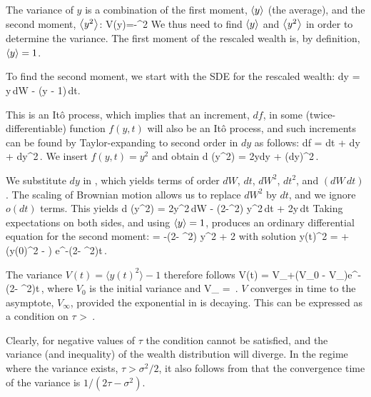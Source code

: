 The variance of $y$ is a combination of the first moment, $\left\langle y \right\rangle$ (the average), and the second moment, $\left\langle y^2 \right\rangle$:
\be
V\left(y\right)=-^2
\ee
We thus need to find $\left\langle y \right\rangle$ and $\left\langle y^2 \right\rangle$ in order to determine the variance. 
The first moment of the rescaled wealth is, by definition, $\left\langle y \right\rangle=1$. 

To find the second moment, we start with the SDE for the rescaled wealth:
\be
dy = \sigma y\,dW - \tau\left(y - 1\right)\,dt.
\ee

This is an It\^o process, which implies that an increment, $df$, in some (twice-differentiable) function $f\left(y,t\right)$ will also be an It\^o process, and such increments can be found by Taylor-expanding to second order in $dy$ as follows:
\be
df =  dt +  dy +  dy^2\,.
\ee
We insert $f\left(y,t\right)=y^2$ and obtain
\be
d \left(y^2\right) = 2ydy + \left(dy\right)^2\,.
\ee

We substitute $dy$ in , which yields terms of order $dW$, $dt$, $dW^2$, $dt^2$, and $\left(dW\,dt\right)$. The scaling of Brownian motion allows us to replace $dW^2$ by $dt$, and we ignore $o\left(dt\right)$ terms. This yields
\bea
d \left(y^2\right) = 2\sigma y^2\,dW - \left(2\tau-\sigma^2\right) y^2\,dt + 2\tau y\,dt %
\eea
Taking expectations on both sides, and using $\left\langle y \right\rangle=1$, produces an ordinary differential equation for the second moment:
\be
{} = -\left(2\tau - \sigma^2\right) \langle y^2 \rangle + 2\tau
{}
\ee
with solution
\be
\langle y\left(t\right)^2 \rangle =  + \left(\langle y\left(0\right)^2 \rangle - \right) e^{-\left(2\tau - \sigma^2\right)t}\,.
\ee

The variance $V\left(t\right)=\langle y\left(t\right)^2 \rangle-1$ therefore follows
\be
V\left(t\right) = V_{\infty}+\left(V_0 - V_{\infty}\right)e^{-\left(2\tau - \sigma^2\right)t}\,,
\ee
where $V_0$ is the initial variance and
\be
V_{\infty} = \,.
\ee
$V$ converges in time to the asymptote, $V_{\infty}$, provided the exponential in  is decaying. 
This can be expressed as a condition on $\tau$
\be
\tau >  \,.
\ee

Clearly, for negative values of $\tau$ the condition cannot be satisfied, and the variance (and inequality) of the wealth distribution will diverge. 
In the regime where the variance exists, $\tau > \sigma^2/2$, it also follows from  that the convergence time of the variance is $1/\left(2\tau - \sigma^2\right)$.

